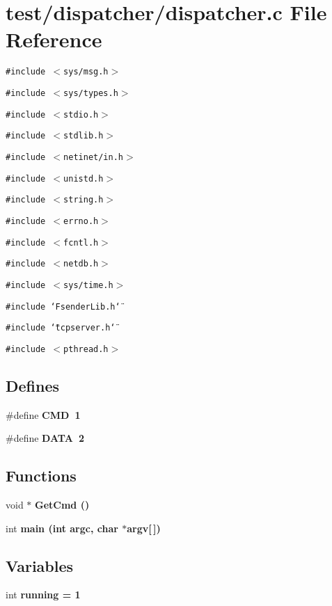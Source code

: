 \section{test/dispatcher/dispatcher.c File Reference}
\label{dispatcher_8c}
{\tt \#include $<$sys/msg.h$>$}\par
{\tt \#include $<$sys/types.h$>$}\par
{\tt \#include $<$stdio.h$>$}\par
{\tt \#include $<$stdlib.h$>$}\par
{\tt \#include $<$netinet/in.h$>$}\par
{\tt \#include $<$unistd.h$>$}\par
{\tt \#include $<$string.h$>$}\par
{\tt \#include $<$errno.h$>$}\par
{\tt \#include $<$fcntl.h$>$}\par
{\tt \#include $<$netdb.h$>$}\par
{\tt \#include $<$sys/time.h$>$}\par
{\tt \#include \char`\"{}Fsender\-Lib.h\char`\"{}}\par
{\tt \#include \char`\"{}tcpserver.h\char`\"{}}\par
{\tt \#include $<$pthread.h$>$}\par
\subsection*{Defines}
\begin{CompactItemize}
\item 
\#define \bf{CMD}~1
\item 
\#define \bf{DATA}~2
\end{CompactItemize}
\subsection*{Functions}
\begin{CompactItemize}
\item 
void $\ast$ \bf{Get\-Cmd} ()
\item 
int \bf{main} (int argc, char $\ast$argv[$\,$])
\end{CompactItemize}
\subsection*{Variables}
\begin{CompactItemize}
\item 
int \bf{running} = 1
\end{CompactItemize}


